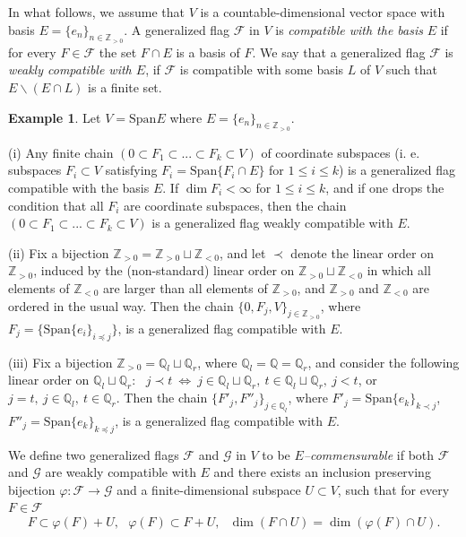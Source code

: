 \documentclass[12pt]{amsart}
\theoremstyle{definition}
\newtheorem{example}[theorem]{Example}
\begin{document}
In what follows, we assume that $V$ is a countable-dimensional 
vector space with basis $E=\{e_n\}_{n\in\mathbb{Z}_{>0}}$. A
generalized flag $\mathcal{F}$ in $V$ is \textit{compatible 
with the basis} $E$ if for every $F\in\mathcal{F}$ the set 
$F\cap E$ is a basis of $F$. We say that a generalized flag 
$\mathcal{F}$ is {\it weakly compatible with $E$}, if 
$\mathcal{F}$ is compatible with some basis $L$ of $V$ such 
that $E \backslash (E \cap L)$ is a finite set. 

\begin{example}
Let $V=\mathrm{Span}E$ where $E=\{e_n\}_{n\in
\mathbb{Z}_{>0}}$.

(i) Any finite chain $(0\subset F_1\subset...\subset F_k
\subset V)$ of coordinate subspaces (i. e. subspaces $F_i
\subset V$ satisfying $F_i=
\mathrm{Span}\{F_i\cap E\}$ for $1\le i\le k$) is a 
generalized flag compatible with the basis $E$. If $\dim F_i<
\infty$ for $1\le i\le k$, and if one drops the condition that 
all $F_i$ are coordinate subspaces, then the chain 
$(0\subset F_1\subset...\subset F_k\subset V)$ is a 
generalized flag weakly compatible with $E$. 

(ii) Fix a bijection $\mathbb{Z}_{>0}=\mathbb{Z}_{>0}\sqcup 
\mathbb{Z}_{<0}$, and let $\prec$ denote the linear order on 
$\mathbb{Z}_{>0}$, induced by the (non-standard) linear order on 
$\mathbb{Z}_{>0}\sqcup\mathbb{Z}_{<0}$ in which all elements of
$\mathbb{Z}_{<0}$ are larger than all elements of 
$\mathbb{Z}_{>0}$, and $\mathbb{Z}_{>0}$ and $\mathbb{Z}_{<0}$ are
ordered in the usual way. Then the chain $\{0,F_j,V\}_{j\in
\mathbb{Z}_{>0}}$, where $F_j=\{\mathrm{Span}\{e_i\}
_{i\preccurlyeq j}\}$, is a generalized flag compatible with 
$E$.

(iii) Fix a bijection $\mathbb{Z}_{>0}=\mathbb{Q}_l\sqcup 
\mathbb{Q}_r$, where $\mathbb{Q}_l=\mathbb{Q}=\mathbb{Q}_r$, and consider the following linear order on $\mathbb{Q}_l\sqcup 
\mathbb{Q}_r$: \ $j\prec t\ \Leftrightarrow\ j\in\mathbb{Q}_l
\sqcup\mathbb{Q}_r,\ t\in\mathbb{Q}_l\sqcup \mathbb{Q}_r,
\ j<t$, or $j=t,\ j\in\mathbb{Q}_l,\ t\in\mathbb{Q}_r$. Then
the chain $\{F'_j,F''_j\}_{j\in\mathbb{Q}_l}$, where 
$F'_j=\mathrm{Span}\{e_k\}_{k\prec j}$, $F''_j=\mathrm{Span}
\{e_k\}_{k\preccurlyeq j}$, is a
generalized flag compatible with $E$.
\end{example}

We define two generalized flags $\mathcal{F}$ and 
$\mathcal{G}$ in $V$ to be {\it $E$--commensurable} if both 
$\mathcal{F}$ and $\mathcal{G}$ are weakly compatible with $E$ 
and there exists an inclusion preserving bijection $\varphi:
\mathcal{F}\to\mathcal{G}$ and a finite-dimensional subspace 
$U \subset V$, such that for every $F \in \mathcal{F}$
\begin{equation*}\label{E-commens}
F\subset\varphi(F)+U,\ \ \ \varphi(F)\subset F+U,\ \ \ 
\dim(F\cap U)=\dim(\varphi(F)\cap U).
\end{equation*}
\end{document}
